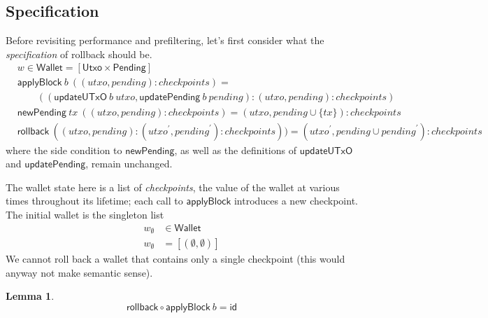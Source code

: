 \documentclass{article}
\newtheorem{lemma}{Lemma}
\begin{document}
\subsection{Specification}
\label{sec:rollback_spec}

Before revisiting performance and prefiltering, let's first consider what
the \emph{specification} of rollback should be.
%
\begin{align*}
& w \in \mathsf{Wallet} = [\mathsf{Utxo} \times \mathsf{Pending}] \\
& \mathsf{applyBlock} ~ b ~ ((\mathit{utxo}, \mathit{pending}) : \mathit{checkpoints}) = \\
& \qquad (( \mathsf{updateUTxO} ~ b ~ \mathit{utxo}
         , \mathsf{updatePending} ~ b ~ \mathit{pending}
         )
         : (\mathit{utxo}, \mathit{pending}) : \mathit{checkpoints}
         ) \\
& \mathsf{newPending} ~ tx ~ ((\mathit{utxo}, \mathit{pending}) : \mathit{checkpoints}) = (\mathit{utxo}, pending \cup \{ tx \} ) : \mathit{checkpoints} \\
& \mathsf{rollback} ~ ((\mathit{utxo}, \mathit{pending}) :  (\mathit{utxo}^\prime, \mathit{pending}^\prime) : \mathit{checkpoints})) =
     (\mathit{utxo}^\prime, \mathit{pending} \cup \mathit{pending}^\prime) : \mathit{checkpoints}
\end{align*}
%
where the side condition to $\mathsf{newPending}$, as well as the definitions
of $\mathsf{updateUTxO}$ and $\mathsf{updatePending}$, remain unchanged.

The wallet state here is a list of \emph{checkpoints}, the value of the wallet
at various times throughout its lifetime; each call to $\mathsf{applyBlock}$
introduces a new checkpoint. The initial wallet is the singleton list
%
\begin{equation}
\begin{split}
w_\emptyset & \in \mathsf{Wallet} \\
w_\emptyset & = [(\emptyset, \emptyset)]
\end{split}
\end{equation}
%
We cannot roll back a wallet that contains only a single checkpoint
(this would anyway not make semantic sense).


\begin{lemma}
\begin{equation*}
\mathsf{rollback} \circ \mathsf{applyBlock} ~ b = \mathsf{id}
\end{equation*}
\end{lemma}
\end{document}
